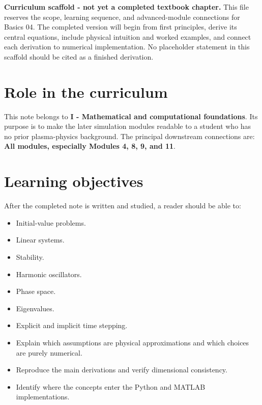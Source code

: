 \documentclass[11pt]{article}
\begin{document}

\begin{overviewbox}
\textbf{Curriculum scaffold - not yet a completed textbook chapter.} This file reserves the scope, learning sequence, and advanced-module connections for Basics 04. The completed version will begin from first principles, derive its central equations, include physical intuition and worked examples, and connect each derivation to numerical implementation. No placeholder statement in this scaffold should be cited as a finished derivation.
\end{overviewbox}

\ProjectTOC

\section{Role in the curriculum}
This note belongs to \textbf{I - Mathematical and computational foundations}. Its purpose is to make the later simulation modules readable to a student who has no prior plasma-physics background. The principal downstream connections are: \textbf{All modules, especially Modules 4, 8, 9, and 11}.

\section{Learning objectives}
After the completed note is written and studied, a reader should be able to:
\begin{itemize}[leftmargin=1.6em]
\item Initial-value problems.
\item Linear systems.
\item Stability.
\item Harmonic oscillators.
\item Phase space.
\item Eigenvalues.
\item Explicit and implicit time stepping.
\item Explain which assumptions are physical approximations and which choices are purely numerical.
\item Reproduce the main derivations and verify dimensional consistency.
\item Identify where the concepts enter the Python and MATLAB implementations.
\end{itemize}
\end{document}
